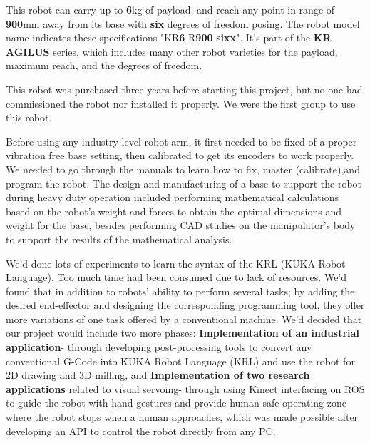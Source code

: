 This robot can carry up to \textbf{6}kg of payload, and reach any point in range of \textbf{900}mm away from its base with \textbf{six} degrees of freedom posing. The robot model name indicates these specifications "KR\textbf{6} R\textbf{900} \textbf{sixx}". It's part of the \textbf{KR AGILUS} series, which includes many other robot varieties for the payload, maximum reach, and the degrees of freedom. 

This robot was purchased three years before starting this project, but no one had commissioned the robot nor installed it properly. We were the first group to use this robot.
 
Before using any industry level robot arm, it first needed to be fixed of a proper- vibration free base setting, then calibrated to get its encoders to work properly. We needed to go through the manuals to learn how to fix, master (calibrate),and program the robot. The design and manufacturing of a base to support the robot during heavy duty operation included performing mathematical calculations based on the robot’s weight and forces to obtain the optimal dimensions and weight for the base, besides performing CAD studies on the manipulator’s body to support the results of the mathematical analysis.

We'd done lots of experiments to learn the syntax of the KRL (KUKA Robot Language). Too much time had been consumed due to lack of resources. We'd found that in addition to robots’ ability to perform several tasks; by adding the desired end-effector and designing the corresponding programming tool, they offer more variations of one task offered by a conventional machine. We'd decided that our project would include two more phases:  \textbf{Implementation of an industrial application}- through developing post-processing tools to convert any conventional G-Code into KUKA Robot Language (KRL) and use the robot for 2D drawing and 3D milling, and \textbf{ Implementation of two research applications} related to visual servoing- through using Kinect interfacing on ROS to guide the robot with hand gestures and provide human-safe operating zone where the robot stops when a human approaches, which was made possible after developing an API to control the robot directly from any PC.	
 
	

